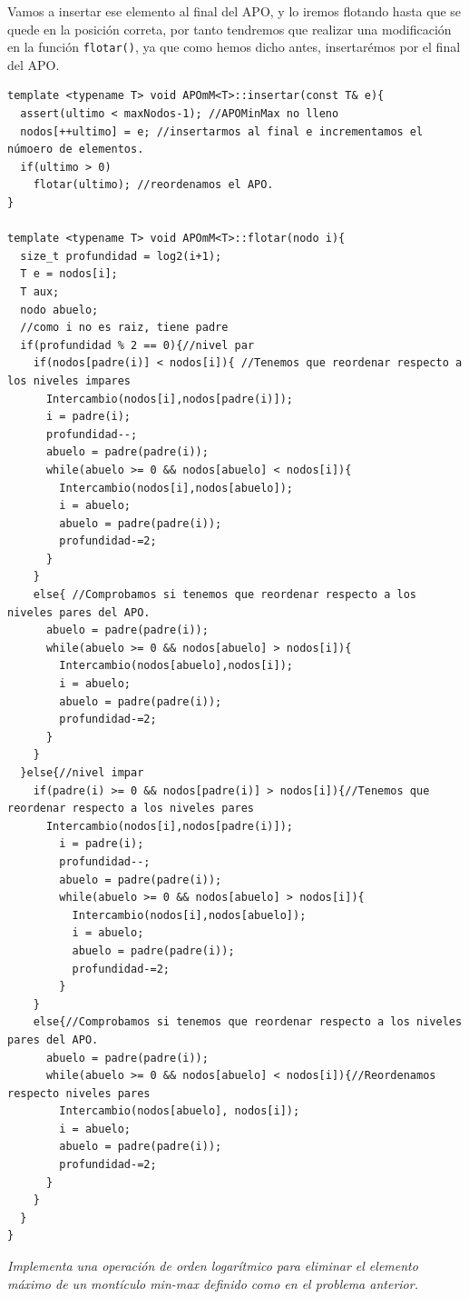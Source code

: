 Vamos a insertar ese elemento al final del APO, y lo iremos flotando hasta que se quede en la posición correta, por tanto tendremos que realizar una modificación en la función \texttt{flotar()}, ya que como hemos dicho antes, insertarémos por el final del APO.

\begin{verbatim}
template <typename T> void APOmM<T>::insertar(const T& e){
  assert(ultimo < maxNodos-1); //APOMinMax no lleno
  nodos[++ultimo] = e; //insertarmos al final e incrementamos el númoero de elementos.
  if(ultimo > 0)
    flotar(ultimo); //reordenamos el APO.
}

template <typename T> void APOmM<T>::flotar(nodo i){
  size_t profundidad = log2(i+1);
  T e = nodos[i];
  T aux;
  nodo abuelo;
  //como i no es raiz, tiene padre
  if(profundidad % 2 == 0){//nivel par
    if(nodos[padre(i)] < nodos[i]){ //Tenemos que reordenar respecto a los niveles impares
      Intercambio(nodos[i],nodos[padre(i)]);
      i = padre(i);
      profundidad--;
      abuelo = padre(padre(i));
      while(abuelo >= 0 && nodos[abuelo] < nodos[i]){
        Intercambio(nodos[i],nodos[abuelo]);
        i = abuelo;
        abuelo = padre(padre(i));
        profundidad-=2;
      }
    }
    else{ //Comprobamos si tenemos que reordenar respecto a los niveles pares del APO.
      abuelo = padre(padre(i));
      while(abuelo >= 0 && nodos[abuelo] > nodos[i]){
        Intercambio(nodos[abuelo],nodos[i]);
        i = abuelo;
        abuelo = padre(padre(i));
        profundidad-=2;
      }
    }
  }else{//nivel impar
    if(padre(i) >= 0 && nodos[padre(i)] > nodos[i]){//Tenemos que reordenar respecto a los niveles pares
      Intercambio(nodos[i],nodos[padre(i)]);
        i = padre(i);
        profundidad--;
        abuelo = padre(padre(i));
        while(abuelo >= 0 && nodos[abuelo] > nodos[i]){
          Intercambio(nodos[i],nodos[abuelo]);
          i = abuelo;
          abuelo = padre(padre(i));
          profundidad-=2;
        }
    }
    else{//Comprobamos si tenemos que reordenar respecto a los niveles pares del APO.
      abuelo = padre(padre(i));
      while(abuelo >= 0 && nodos[abuelo] < nodos[i]){//Reordenamos respecto niveles pares
        Intercambio(nodos[abuelo], nodos[i]);
        i = abuelo;
        abuelo = padre(padre(i));
        profundidad-=2;
      }
    }
  }
}
\end{verbatim}

\textbf{\large{}}\textit{ Implementa una operación de orden logarítmico para eliminar el elemento máximo de un montículo min-max definido como en el problema anterior.}

